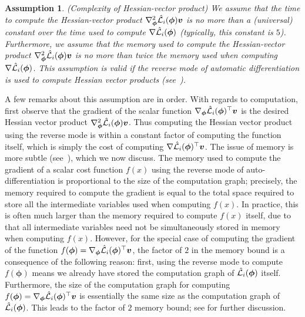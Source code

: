 \documentclass{article} \usepackage[nonatbib, final]{mod_neurips}
\newtheorem{assumption}{Assumption}
\newcommand{\param}{{\bm{\phi}}}               \newcommand{\paramspace}{\Phi}
\newcommand{\pgrad}{\nabla}
\begin{document}
\begin{assumption}  \label{assumption:HVP}
  (Complexity of Hessian-vector product)
We assume that the time to compute the Hessian-vector product
$\pgrad^2_\param \fnht_i(\param) \bm{v}$ is no more than a
(universal) constant over the time used to compute
$\pgrad \fnht_i(\param)$ (typically, this constant is
$5$). Furthermore, we assume that the memory used to compute the
Hessian-vector product $\pgrad^2_\param \fnht_i(\param) \bm{v}$ is
no more than twice the memory used when computing
$\pgrad \fnht_i(\param)$.  This
assumption is valid if the reverse mode of automatic differentiation is  used to compute Hessian vector products
(see~\cite{Griewank1993SomeBO}).
\end{assumption}



A few remarks about this assumption are in order. With regards to
computation, first observe that the gradient of the scalar function
$\pgrad_\param \fnht_i(\param)^\top \bm{v}$ is the desired Hessian vector product
$\pgrad_\param^2 \fnht_i(\param) \bm{v}$. Thus computing the Hessian vector product
using the reverse mode is within a constant
factor of computing the function itself, which is simply the cost of
computing $\pgrad \fnht_i(\param)^\top \bm{v}$. The issue of memory is
more subtle (see~\cite{Griewank1993SomeBO}), which we now discuss.
The memory used to compute the gradient of a scalar cost
function $f(x)$ using the reverse mode of auto-differentiation is proportional to the size
of the computation graph; precisely, the memory required to compute the
gradient is equal to the total space required to store all the
intermediate variables used when computing $f(x)$. In practice, this
is often much larger than the memory required to compute
$f(x)$ itself, due to that all intermediate variables need not be simultaneously stored in
memory when computing $f(x)$. However, for the special case of
computing the gradient of the function $f(\param)= \pgrad_\param
\fnht_i(\param)^\top \bm{v}$, the factor of $2$ in the memory bound is a consequence
of the following
reason: first, using the reverse mode to compute $f(\param)$ means we
already have stored the computation graph
of $\fnht_i(\param)$ itself. Furthermore, the size of the computation graph for computing $f(\param)= \pgrad_\param
\fnht_i(\param)^\top \bm{v}$
is essentially the same size as the computation graph of
$\fnht_i(\param)$.
This leads to the factor of $2$ memory bound; see
\citet{Griewank1993SomeBO} for further discussion.
\end{document}
